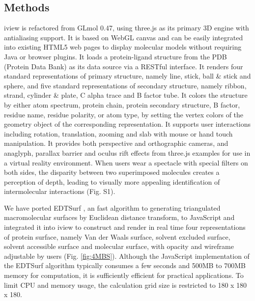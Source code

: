 \documentclass{bioinfo}
\begin{document}
\begin{methods}
\section{Methods}

iview is refactored from GLmol 0.47, using three.js as its primary 3D engine with antialiasing support. It is based on WebGL canvas and can be easily integrated into existing HTML5 web pages to display molecular models without requiring Java or browser plugins. It loads a protein-ligand structure from the PDB (Protein Data Bank) \citep{539,537} as its data source via a RESTful interface. It renders four standard representations of primary structure, namely line, stick, ball \& stick and sphere, and five standard representations of secondary structure, namely ribbon, strand, cylinder \& plate, C alpha trace and B factor tube. It colors the structure by either atom spectrum, protein chain, protein secondary structure, B factor, residue name, residue polarity, or atom type, by setting the vertex colors of the geometry object of the corresponding representation. It supports user interactions including rotation, translation, zooming and slab with mouse or hand touch manipulation. It provides both perspective and orthographic cameras, and anaglyph, parallax barrier and oculus rift effects from three.js examples for use in a virtual reality environment. When users wear a spectacle with special filters on both sides, the disparity between two superimposed molecules creates a perception of depth, leading to visually more appealing identification of intermolecular interactions (Fig. S1).

We have ported EDTSurf \citep{1297,1350}, an fast algorithm to generating triangulated macromolecular surfaces by Euclidean distance transform, to JavaScript and integrated it into iview to construct and render in real time four representations of protein surface, namely Van der Waals surface, solvent excluded surface, solvent accessible surface and molecular surface, with opacity and wireframe adjustable by users (Fig. \ref{fig:4MBS}). Although the JavaScript implementation of the EDTSurf algorithm typically consumes a few seconds and 500MB to 700MB memory for computation, it is sufficiently efficient for practical applications. To limit CPU and memory usage, the calculation grid size is restricted to 180 x 180 x 180.


\end{methods}
\end{document}
